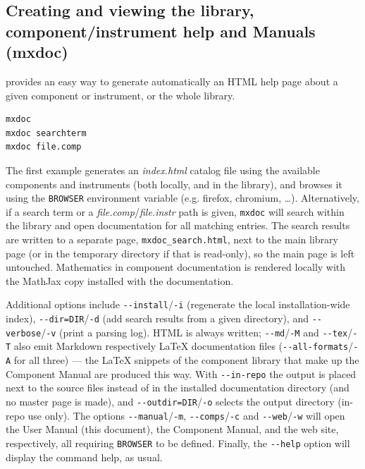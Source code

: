 \subsection{Creating and viewing the library, component/instrument help and
  Manuals (mxdoc)}
\label{s:mxdoc-run}

\MCX provides an easy way to generate automatically an HTML help page about a
given component or instrument, or the whole \MCX
library. 
\begin{lstlisting}
mxdoc
mxdoc searchterm
mxdoc file.comp
\end{lstlisting}
The first example generates an \textit{index.html} catalog file using the available
components and instruments (both locally, and in the \MCX library), and browses
it using the \verb+BROWSER+ environment variable
(e.g. firefox, chromium, \ldots). Alternatively, if a search term or a
\textit{file.comp}/\textit{file.instr} path is given, \verb+mxdoc+ will
search within the library and open documentation for all matching entries. The search results are written to a
separate page, \texttt{mxdoc\_search.html}, next to the main library page (or in the temporary directory if that is read-only), so the main page is left untouched. Mathematics in component documentation is rendered locally with the MathJax copy installed with the documentation.

Additional options include \verb+--install+/\verb+-i+ (regenerate the local
installation-wide index), \verb+--dir=DIR+/\verb+-d+ (add search results from
a given directory), and \verb+--verbose+/\verb+-v+ (print a parsing log).
HTML is always written; \verb+--md+/\verb+-M+ and \verb+--tex+/\verb+-T+ also
emit Markdown respectively \LaTeX{} documentation files (\verb+--all-formats+/\verb+-A+
for all three) --- the \LaTeX{} snippets of the component library that make up
the Component Manual are produced this way. With \verb+--in-repo+ the output is
placed next to the source files instead of in the installed documentation
directory (and no master page is made), and \verb+--outdir=DIR+/\verb+-o+
selects the output directory (in-repo use only).
The options \verb+--manual+/\verb+-m+, \verb+--comps+/\verb+-c+ and
\verb+--web+/\verb+-w+ will open the User Manual (this document), the
Component Manual, and the \MCX web site, respectively, all requiring
\verb+BROWSER+ to be defined. Finally, the \verb+--help+
option will display the command help, as usual.

